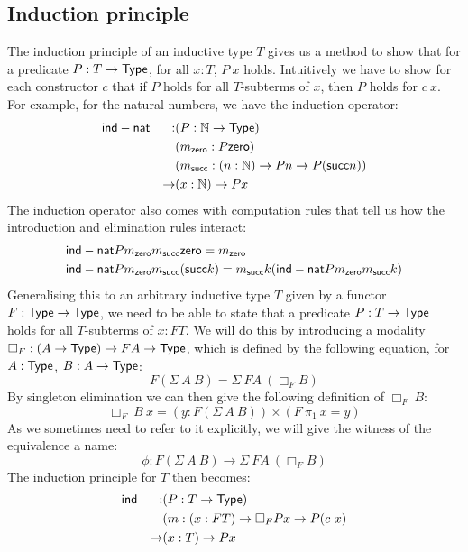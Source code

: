 \documentclass[a4paper,10pt]{article}
\begin{document}
\subsection{Induction principle}
\label{sec:oitinduction}

The induction principle of an inductive type $T$ gives us a method to
show that for a predicate $P : T \to \mathsf{Type}$, for all $x : T$, $P\ x$
holds. Intuitively we have to show for each constructor $c$ that if
$P$ holds for all $T$-subterms of $x$, then $P$ holds for $c\ x$. For
example, for the natural numbers, we have the induction operator:
%
\begin{align*}
  &\mathsf{ind-nat} &:   &(P : \mathbb{N} \to \mathsf{Type}) \\
  &        &    &(m_{\mathsf{zero}} : P \mathsf{zero}) \\
  &        &    &(m_{\mathsf{succ}} : (n : \mathbb{N}) \to P n \to P (\mathsf{succ} n)) \\
  &        &\to &(x : \mathbb{N}) \to P x
\end{align*}
%
The induction operator also comes with computation rules that tell us
how the introduction and elimination rules interact:
%
\begin{align*}
  &\mathsf{ind-nat} P m_{\mathsf{zero}} m_{\mathsf{succ}} \mathsf{zero} = m_{\mathsf{zero}} \\
  &\mathsf{ind-nat} P m_{\mathsf{zero}} m_{\mathsf{succ}} (\mathsf{succ} k) = m_{\mathsf{succ}} k (\mathsf{ind-nat} P m_{\mathsf{zero}} m_{\mathsf{succ}} k)
\end{align*}
%
Generalising this to an arbitrary inductive type $T$ given by a
functor $F : \mathsf{Type} \to \mathsf{Type}$, we need to be able to state that a
predicate $P : T \to \mathsf{Type}$ holds for all $T$-subterms of $x : FT$. We
will do this by introducing a modality
$\Box_F : (A \to \mathsf{Type}) \to FA \to \mathsf{Type}$, which is defined by the
following equation, for $A : \mathsf{Type}$, $B : A \to \mathsf{Type}$:
$$
F (\Sigma\ A\ B) = \Sigma\ FA\ (\Box_{F} B)
$$
By singleton elimination we can then give the following definition of $\Box_{F}\ B$:
$$
\Box_{F}\ B\ x = (y : F (\Sigma\ A\ B)) \times (F\ \pi_1\ x = y)
$$
As we sometimes need to refer to it explicitly, we will give the
witness of the equivalence a name:
$$
\phi : F (\Sigma\ A\ B) \to \Sigma\ FA\ (\Box_{F} B)
$$
The induction principle for $T$ then becomes:
%
\begin{align*}
  &\mathsf{ind} &:   &(P : T \to \mathsf{Type}) \\
  &     &    &(m : (x : FT) \to \Box_{F} P x \to P (c\ x) \\
  &     &\to &(x : T) \to P x
\end{align*}
%

\end{document}
